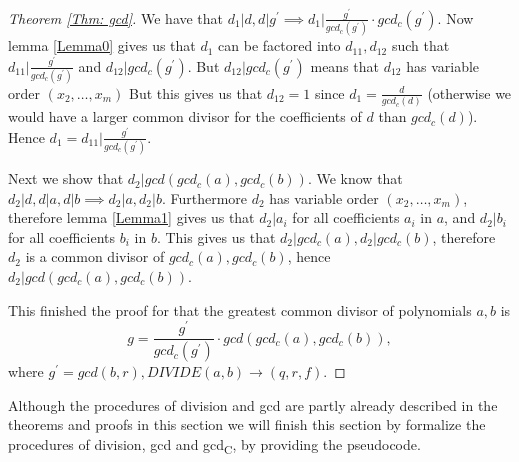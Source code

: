\begin{proof}[Theorem \ref{Thm: gcd}]
  We have that $d_1|d, d|g^\prime \implies d_1\Big|\frac{g^\prime}{gcd_c(g^\prime)}\cdot gcd_c(g^\prime)$. Now lemma \ref{Lemma0} gives us that $d_1$ can be factored into $d_{11},d_{12}$ such that $d_{11}\Big|\frac{g^\prime}{gcd_c(g^\prime)}$ and $d_{12}|gcd_c(g^\prime)$. But $d_{12}|gcd_c(g^\prime)$ means that $d_{12}$ has variable order $(x_2,\ldots,x_m)$ But this gives us that $d_{12}=1$ since $d_1=\frac{d}{gcd_c(d)}$ (otherwise we would have a larger common divisor for the coefficients of $d$ than $gcd_c(d)$). Hence $d_1=d_{11}\Big|\frac{g^\prime}{gcd_c(g^\prime)}$.

  Next we show that $d_2|gcd(gcd_c(a),gcd_c(b))$. We know that $d_2|d, d|a, d|b \implies d_2|a, d_2|b$. Furthermore $d_2$ has variable order $(x_2,\ldots,x_m)$, therefore lemma \ref{Lemma1} gives us that $d_2|a_i$ for all coefficients $a_i$ in $a$, and $d_2|b_i$ for all coefficients $b_i$ in $b$. This gives us that $d_2|gcd_c(a), d_2|gcd_c(b)$, therefore $d_2$ is a common divisor of $gcd_c(a),gcd_c(b)$, hence $d_2|gcd(gcd_c(a),gcd_c(b))$.

  This finished the proof for that the greatest common divisor of polynomials $a,b$ is
  \begin{equation}
    g=\frac{g^\prime}{gcd_c(g^\prime)}\cdot gcd(gcd_c(a),gcd_c(b)),
  \end{equation}
  where $g^\prime=gcd(b,r), DIVIDE(a,b) \rightarrow (q,r,f)$.
\end{proof}
Although the procedures of division and gcd are partly already described in the theorems and proofs in this section we will finish this section by formalize the procedures of division, gcd and gcd\textsubscript{C}, by providing the pseudocode.

